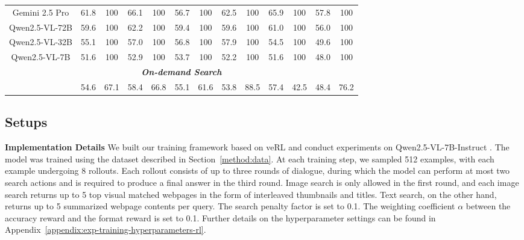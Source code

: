 \documentclass{article}
\begin{document}
\begin{table}[t]
\begin{tabular}{ccccccccccccc}
\multicolumn{1}{c|}{Gemini 2.5 Pro} & 61.8 & \multicolumn{1}{c|}{100} & 66.1 & 100 & 56.7 & \multicolumn{1}{c|}{100} & 62.5 & 100 & 65.9 & 100 & 57.8 & 100 \\
\multicolumn{1}{c|}{Qwen2.5-VL-72B} & 59.6 & \multicolumn{1}{c|}{100} & 62.2 & 100 & 59.4 & \multicolumn{1}{c|}{100} & 59.6 & 100 & 61.0 & 100 & 56.0 & 100 \\
\multicolumn{1}{c|}{Qwen2.5-VL-32B} & 55.1 & \multicolumn{1}{c|}{100} & 57.0 & 100 & 56.8 & \multicolumn{1}{c|}{100} & 57.9 & 100 & 54.5 & 100 & 49.6 & 100 \\
\multicolumn{1}{c|}{Qwen2.5-VL-7B} & 51.6 & \multicolumn{1}{c|}{100} & 52.9 & 100 & 53.7 & \multicolumn{1}{c|}{100} & 52.2 & 100 & 51.6 & 100 & 48.0 & 100 \\ \midrule
\multicolumn{13}{c}{\textit{\textbf{On-demand Search}}} \\ \midrule
\rowcolor{lightgreen}
\multicolumn{1}{c|}{\textbf{MMSearch-R1-7B}} & 54.6 & \multicolumn{1}{c|}{67.1} & 58.4 & 66.8 & 55.1 & \multicolumn{1}{c|}{61.6} & 53.8 & 88.5 & 57.4 & 42.5 & 48.4 & 76.2 \\ \bottomrule
\end{tabular}
\end{table}

\subsection{Setups}
\label{main/exp-setups}
\textbf{Implementation Details} We built our training framework based on veRL \cite{code/verl} and conduct experiments on Qwen2.5-VL-7B-Instruct \cite{lmm/qw25vl}. The model was trained using the dataset described in Section~\ref{method:data}. At each training step, we sampled 512 examples, with each example undergoing 8 rollouts. Each rollout consists of up to three rounds of dialogue, during which the model can perform at most two search actions and is required to produce a final answer in the third round. Image search is only allowed in the first round, and each image search returns up to 5 top visual matched webpages in the form of interleaved thumbnails and titles. Text search, on the other hand, returns up to 5 summarized webpage contents per query. The search penalty factor is set to 0.1. The weighting coefficient $\alpha$ between the accuracy reward and the format reward is set to 0.1. Further details on the hyperparameter settings can be found in Appendix~\ref{appendix:exp-training-hyperparameters-rl}.
\end{document}
